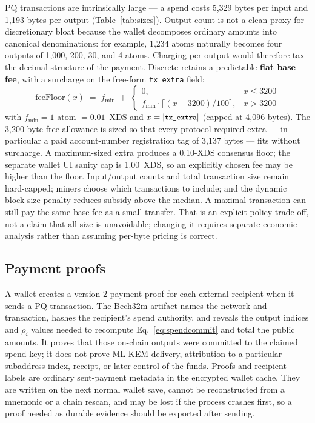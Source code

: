 \documentclass[11pt,a4paper]{article}
\newcommand{\code}[1]{\texttt{\small #1}}
\begin{document}
PQ transactions are intrinsically large --- a spend costs 5{,}329 bytes per
input and 1{,}193 bytes per output (Table~\ref{tab:sizes}). Output count is not
a clean proxy for discretionary bloat because the wallet decomposes ordinary
amounts into canonical denominations: for example, 1{,}234 atoms naturally
becomes four outputs of 1{,}000, 200, 30, and 4 atoms. Charging per output would
therefore tax the decimal structure of the payment. Discrete retains a
predictable \textbf{flat base fee}, with a surcharge on the free-form
\code{tx\_extra} field:
\begin{equation}
\mathrm{feeFloor}(x) \;=\; f_{\min} \;+\;
\begin{cases}
0, & x \le 3200 \\[2pt]
f_{\min} \cdot \bigl\lceil (x - 3200)/100 \bigr\rceil, & x > 3200
\end{cases}
\label{eq:fee}
\end{equation}
with $f_{\min} = 1$ atom $= 0.01$~XDS and
$x = |\code{tx\_extra}|$ (capped at
4{,}096 bytes). The 3{,}200-byte free allowance is sized so that every
protocol-required extra --- in particular a paid account-number registration
tag of 3{,}137 bytes --- fits without surcharge. A maximum-sized extra produces
a 0.10-XDS consensus floor; the separate wallet UI sanity cap is 1.00~XDS, so
an explicitly chosen fee may be higher than the floor. Input/output counts and total transaction size remain
hard-capped; miners choose which transactions to include; and the dynamic
block-size penalty reduces subsidy above the median. A maximal transaction can
still pay the same base fee as a small transfer. That is an explicit policy
trade-off, not a claim that all size is unavoidable; changing it requires
separate economic analysis rather than assuming per-byte pricing is correct.

\subsection{Payment proofs}\label{sec:proofs}

A wallet creates a version-2 payment proof for each external recipient when it
sends a PQ transaction. The Bech32m artifact names the network and transaction,
hashes the recipient's spend authority, and reveals the output indices and
$\rho_i$ values needed to recompute Eq.~\eqref{eq:spendcommit} and total the
public amounts. It proves that those on-chain outputs were committed to the
claimed spend key; it does not prove ML-KEM delivery, attribution to a particular
subaddress index, receipt, or later control of the funds. Proofs and recipient
labels are ordinary sent-payment metadata in the encrypted wallet cache. They
are written on the next normal wallet save, cannot be reconstructed from a
mnemonic or a chain rescan, and may be lost if the process crashes first, so a
proof needed as durable evidence should be exported after sending.
\end{document}
